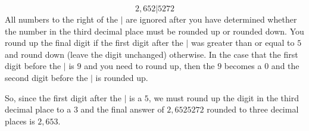 \begin{equation*}
2,652|5272
\end{equation*}
All numbers to the right of the $|$ are ignored after you have determined whether the number in the third decimal place must be rounded up or rounded down. You round up the final digit if the first digit after the $|$ was greater than or equal to $5$ and round down (leave the digit unchanged) otherwise. In the case that the first digit before the $|$ is $9$ and you need to round up, then the $9$ becomes a $0$ and the second digit before the $|$ is rounded up.\par 
So, since the first digit after the $|$ is a $5$, we must round up the digit in the third decimal place to a $3$ and the final answer of $2,6525272$ rounded to three decimal places is $2,653$.
\par


